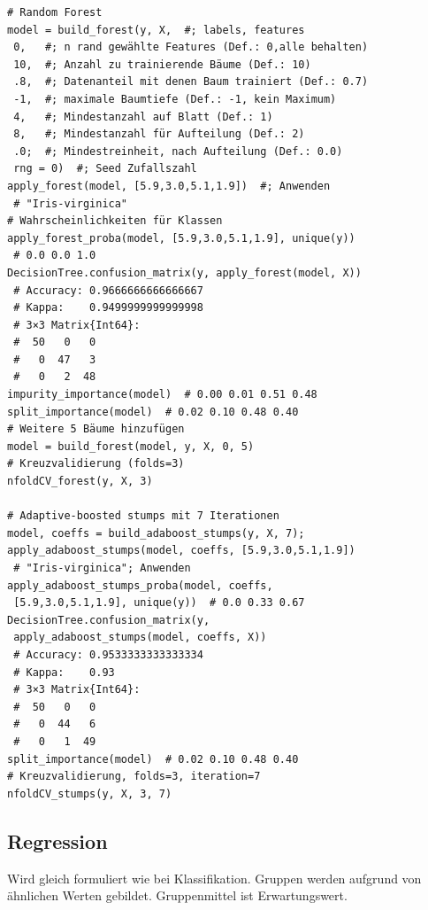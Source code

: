 \documentclass[10pt,twocolumn]{scrartcl}
\begin{document}
\begin{lstlisting}
# Random Forest
model = build_forest(y, X,  #; labels, features
 0,   #; n rand gewählte Features (Def.: 0,alle behalten)
 10,  #; Anzahl zu trainierende Bäume (Def.: 10)
 .8,  #; Datenanteil mit denen Baum trainiert (Def.: 0.7)
 -1,  #; maximale Baumtiefe (Def.: -1, kein Maximum)
 4,   #; Mindestanzahl auf Blatt (Def.: 1)
 8,   #; Mindestanzahl für Aufteilung (Def.: 2)
 .0;  #; Mindestreinheit, nach Aufteilung (Def.: 0.0)
 rng = 0)  #; Seed Zufallszahl
apply_forest(model, [5.9,3.0,5.1,1.9])  #; Anwenden
 # "Iris-virginica"
# Wahrscheinlichkeiten für Klassen
apply_forest_proba(model, [5.9,3.0,5.1,1.9], unique(y))
 # 0.0 0.0 1.0
DecisionTree.confusion_matrix(y, apply_forest(model, X))
 # Accuracy: 0.9666666666666667
 # Kappa:    0.9499999999999998
 # 3×3 Matrix{Int64}:
 #  50   0   0
 #   0  47   3
 #   0   2  48
impurity_importance(model)  # 0.00 0.01 0.51 0.48
split_importance(model)  # 0.02 0.10 0.48 0.40
# Weitere 5 Bäume hinzufügen
model = build_forest(model, y, X, 0, 5)
# Kreuzvalidierung (folds=3)
nfoldCV_forest(y, X, 3)

# Adaptive-boosted stumps mit 7 Iterationen
model, coeffs = build_adaboost_stumps(y, X, 7);
apply_adaboost_stumps(model, coeffs, [5.9,3.0,5.1,1.9])
 # "Iris-virginica"; Anwenden
apply_adaboost_stumps_proba(model, coeffs,
 [5.9,3.0,5.1,1.9], unique(y))  # 0.0 0.33 0.67
DecisionTree.confusion_matrix(y,
 apply_adaboost_stumps(model, coeffs, X))
 # Accuracy: 0.9533333333333334
 # Kappa:    0.93
 # 3×3 Matrix{Int64}:
 #  50   0   0
 #   0  44   6
 #   0   1  49
split_importance(model)  # 0.02 0.10 0.48 0.40
# Kreuzvalidierung, folds=3, iteration=7
nfoldCV_stumps(y, X, 3, 7)
\end{lstlisting}

\subsection{Regression}

Wird gleich formuliert wie bei Klassifikation. Gruppen werden aufgrund von ähnlichen Werten gebildet. Gruppenmittel ist Erwartungswert.
\end{document}
